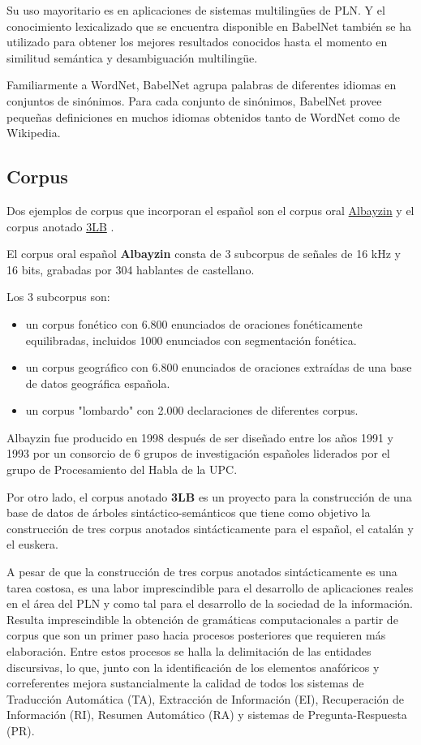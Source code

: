 \documentclass[11pt]{exam}
\begin{document}
\begin{questions}
Su uso mayoritario es en aplicaciones de sistemas multilingües de PLN. Y el conocimiento lexicalizado que se encuentra disponible en BabelNet también se ha utilizado para obtener los mejores resultados conocidos hasta el momento en similitud semántica y desambiguación multilingüe.

Familiarmente a WordNet, BabelNet agrupa palabras de diferentes idiomas en conjuntos de sinónimos. Para cada conjunto de sinónimos, BabelNet provee pequeñas definiciones en muchos idiomas obtenidos tanto de WordNet como de Wikipedia.

\subsection*{Corpus}

Dos ejemplos de corpus que incorporan el español son el corpus oral \href{http://www.talp.upc.edu/content/albayzin}{Albayzin} y el corpus anotado \href{https://www.dlsi.ua.es/projectes/3lb/}{3LB} . 

El corpus oral español {\bf Albayzin} consta de 3 subcorpus de señales de 16 kHz y 16 bits, grabadas por 304 hablantes de castellano.

Los 3 subcorpus son:

\begin{itemize}
	\item un corpus fonético con 6.800 enunciados de oraciones fonéticamente equilibradas, incluidos 1000 enunciados con segmentación fonética.
	\item un corpus geográfico con 6.800 enunciados de oraciones extraídas de una base de datos geográfica española.
	\item un corpus "lombardo" con 2.000 declaraciones de diferentes corpus.
\end{itemize}

Albayzin fue producido en 1998 después de ser diseñado entre los años 1991 y 1993 por un consorcio de 6 grupos de investigación españoles liderados por el grupo de Procesamiento del Habla de la UPC.

Por otro lado, el corpus anotado {\bf 3LB} es un proyecto para la construcción de una base de datos de árboles sintáctico-semánticos que tiene como objetivo la construcción de tres corpus anotados sintácticamente para el español, el catalán y el euskera.

A pesar de que la construcción de tres corpus anotados sintácticamente es una tarea costosa, es una labor imprescindible para el desarrollo de aplicaciones reales en el área del PLN y como tal para el desarrollo de la sociedad de la información. 
Resulta imprescindible la obtención de gramáticas computacionales a partir de corpus que son un primer paso hacia procesos posteriores que requieren más elaboración. Entre estos procesos se halla la delimitación de las entidades discursivas, lo que, junto con la identificación de los elementos anafóricos y correferentes mejora sustancialmente la calidad de todos los sistemas de Traducción Automática (TA), Extracción de Información (EI), Recuperación de Información (RI), Resumen Automático (RA) y sistemas de Pregunta-Respuesta (PR). 


\end{questions}
\end{document}
